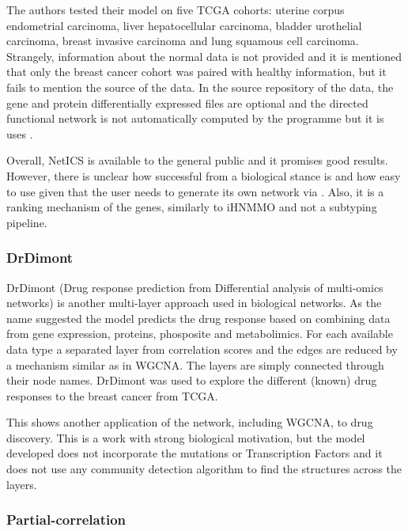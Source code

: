 The authors tested their model on five TCGA cohorts: uterine corpus endometrial carcinoma, liver hepatocellular carcinoma, bladder urothelial carcinoma, breast invasive carcinoma and lung squamous cell carcinoma. Strangely, information about the normal data is not provided and it is mentioned that only the breast cancer cohort was paired with healthy information, but it fails to mention the source of the data. In the source repository of the data, the gene and protein differentially expressed files are optional and the directed functional network is not automatically computed by the programme but it is uses \citet{Wu2010-ap}.

Overall, NetICS is available to the general public and it promises good results. However, there is unclear how successful from a biological stance is and how easy to use given that the user needs to generate its own network via \citet{Wu2010-ap}. Also, it is a ranking mechanism of the genes, similarly to iHNMMO and not a subtyping pipeline.



\subsubsection{DrDimont}

DrDimont (Drug response prediction from Differential analysis of multi-omics networks) \citet{Hiort2022-lk} is another multi-layer approach used in biological networks. As the name suggested the model predicts the drug response based on combining data from gene expression, proteins, phosposite and metabolimics. For each available data type a separated layer from correlation scores and the edges are reduced by a mechanism similar as in WGCNA. The layers are simply connected through their node names. DrDimont was used to explore the different (known) drug responses to the breast cancer from TCGA.

This shows another application of the network, including WGCNA, to drug discovery. This is a work with strong biological motivation, but the model developed does not incorporate the mutations or Transcription Factors and it does not use any community detection algorithm to find the structures across the layers.


\subsubsection{Partial-correlation}

